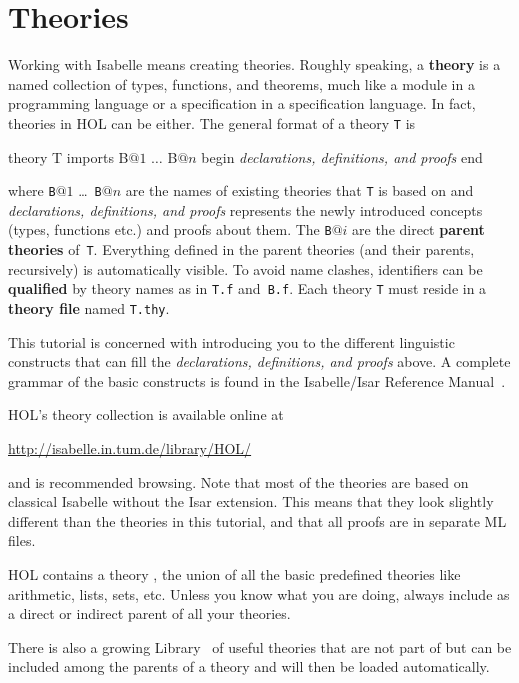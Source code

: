 \section{Theories}
\label{sec:Basic:Theories}

%
Working with Isabelle means creating theories. Roughly speaking, a
\textbf{theory} is a named collection of types, functions, and theorems,
much like a module in a programming language or a specification in a
specification language. In fact, theories in HOL can be either. The general
format of a theory \texttt{T} is
\begin{ttbox}
theory T
imports B\(@1\) \(\ldots\) B\(@n\)
begin
{\rmfamily\textit{declarations, definitions, and proofs}}
end
\end{ttbox}
where \texttt{B}$@1$ \dots\ \texttt{B}$@n$ are the names of existing
theories that \texttt{T} is based on and \textit{declarations,
    definitions, and proofs} represents the newly introduced concepts
(types, functions etc.) and proofs about them. The \texttt{B}$@i$ are the
direct \textbf{parent theories} of~\texttt{T}\@.
Everything defined in the parent theories (and their parents, recursively) is
automatically visible. To avoid name clashes, identifiers can be
\textbf{qualified}
by theory names as in \texttt{T.f} and~\texttt{B.f}. 
Each theory \texttt{T} must
reside in a \textbf{theory file} named \texttt{T.thy}.

This tutorial is concerned with introducing you to the different linguistic
constructs that can fill the \textit{declarations, definitions, and
    proofs} above.  A complete grammar of the basic
constructs is found in the Isabelle/Isar Reference
Manual~\cite{isabelle-isar-ref}.

HOL's theory collection is available online at
\begin{center}\small
    \url{http://isabelle.in.tum.de/library/HOL/}
\end{center}
and is recommended browsing. Note that most of the theories 
are based on classical Isabelle without the Isar extension. This means that
they look slightly different than the theories in this tutorial, and that all
proofs are in separate ML files.

\begin{warn}
  HOL contains a theory , the union of all the basic
  predefined theories like arithmetic, lists, sets, etc.  
  Unless you know what you are doing, always include 
  as a direct or indirect parent of all your theories.
\end{warn}
There is also a growing Library~\cite{HOL-Library}
of useful theories that are not part of  but can be included
among the parents of a theory and will then be loaded automatically.%


